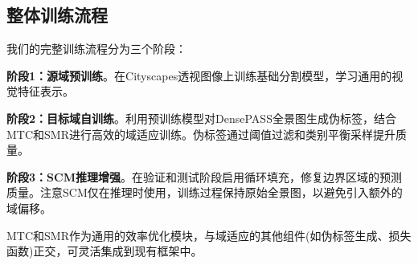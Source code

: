 \subsection{整体训练流程}

我们的完整训练流程分为三个阶段：

\textbf{阶段1：源域预训练}。在Cityscapes透视图像上训练基础分割模型，学习通用的视觉特征表示。

\textbf{阶段2：目标域自训练}。利用预训练模型对DensePASS全景图生成伪标签，结合MTC和SMR进行高效的域适应训练。伪标签通过阈值过滤和类别平衡采样提升质量。

\textbf{阶段3：SCM推理增强}。在验证和测试阶段启用循环填充，修复边界区域的预测质量。注意SCM仅在推理时使用，训练过程保持原始全景图，以避免引入额外的域偏移。

MTC和SMR作为通用的效率优化模块，与域适应的其他组件(如伪标签生成、损失函数)正交，可灵活集成到现有框架中。
